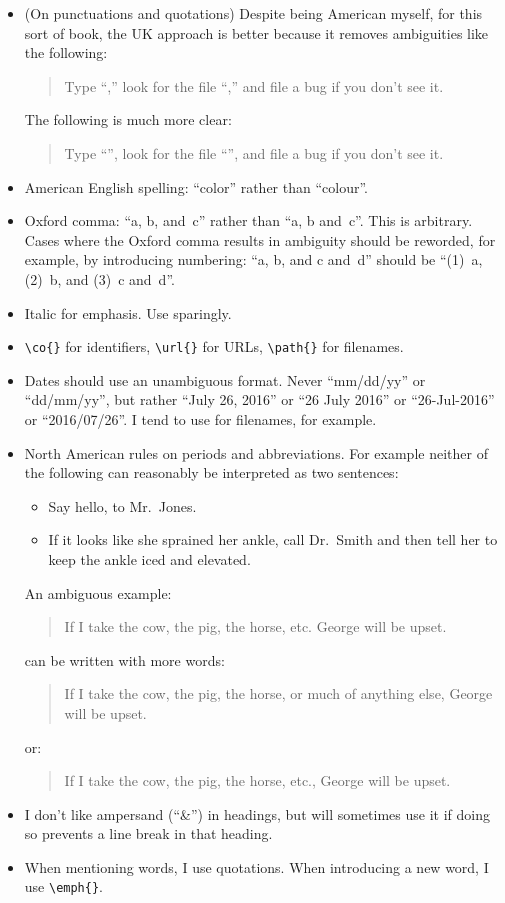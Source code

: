 \begin{itemize}
\item (On punctuations and quotations)
  Despite being American myself, for this sort of book, the UK approach
  is better because it removes ambiguities like the following:
  \begin{quote}
    Type ``,'' look for the file ``,''
    and file a bug if you don't see it.
  \end{quote}

  The following is much more clear:
  \begin{quote}
    Type ``'', look for the file ``'',
    and file a bug if you don't see it.
  \end{quote}
\item American English spelling: ``color'' rather than ``colour''.
\item Oxford comma: ``a, b, and~c'' rather than ``a, b and~c''.
  This is arbitrary.
  Cases where the Oxford comma results in ambiguity should be reworded,
  for example, by introducing numbering:  ``a, b, and c and~d'' should
  be ``(1)~a, (2)~b, and (3)~c and~d''.
\item Italic for emphasis.
  Use sparingly.
\item \verb|\co{}| for identifiers, \verb|\url{}| for URLs,
  \verb|\path{}| for filenames.
\item Dates should use an unambiguous format.
  Never ``mm/dd/yy'' or ``dd/mm/yy'', but rather ``July 26, 2016''
  or ``26 July 2016'' or ``26-Jul-2016'' or ``2016/07/26''.
  I tend to use  for filenames, for example.
\item North American rules on periods and abbreviations.
  For example neither of the following can reasonably be interpreted
  as two sentences:
  \begin{itemize}
  \item Say hello, to Mr.~Jones.
  \item If it looks like she sprained her ankle, call Dr.~Smith and
    then tell her to keep the ankle iced and elevated.
  \end{itemize}

  An ambiguous example:
  \begin{quote}
    If I take the cow, the pig, the horse, etc. George will be upset.
  \end{quote}
  can be written with more words:
  \begin{quote}
    If I take the cow, the pig, the horse, or much of anything else,
    George will be upset.
  \end{quote}
  or:
  \begin{quote}
    If I take the cow, the pig, the horse, etc., George will be upset.
  \end{quote}
\item I don't like ampersand (``\&'') in headings, but will sometimes
  use it if doing so prevents a line break in that heading.
\item When mentioning words, I use quotations.
  When introducing a new word, I use \verb|\emph{}|.
\end{itemize}

